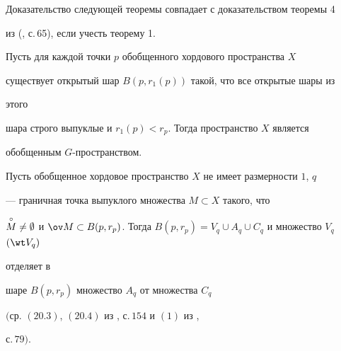  


Доказательство следующей теоремы совпадает с доказательством теоремы 4 


из (\cite{1}, с.\,65), если учесть теорему 1. 


 


\begin{thm} 


Пусть для каждой точки $p$ обобщенного хордового пространства $X$ 


существует открытый шар $B(p,r_1(p))$ такой, что все открытые шары из 


этого 


шара строго выпуклые и $r_1(p)<r_p$. Тогда пространство $X$ является 


обобщенным $G$-пространством. 


\end{thm} 


 


\begin{thm} 


Пусть обобщенное хордовое пространство $X$ не имеет размерности $1$, $q$ 


--- граничная точка выпуклого множества $M\subset X$ такого, что 


$\cM\ne\emptyset$ и $\ov M\subset B(p,r_p)$. Тогда $B(p,r_p)=V_q\cup 


A_q\cup C_q$ и множество $V_q$ $(\wt V_q)$ 


отделяет в 


шаре $B(p,r_p)$ множество $A_q$ от множества $C_q$ 


$($ср. $(20.3)$, $(20.4)$ из \cite{2}, с.\,$154$ и $(1)$ из \cite{1}, 


с.\,$79)$. 


\end{thm} 


 


